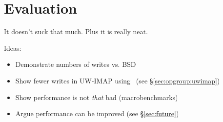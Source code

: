 \section {Evaluation}
\label{sec:evaluation}

It doesn't suck that much. Plus it is really neat.

Ideas:
\begin{itemize}
\item Demonstrate numbers of writes vs. BSD
\item Show fewer writes in UW-IMAP using \opgroups\ (see \S\ref{sec:opgroup:uwimap})
\item Show performance is not \emph{that} bad (macrobenchmarks)
\item Argue performance can be improved (see \S\ref{sec:future})
\end{itemize}
